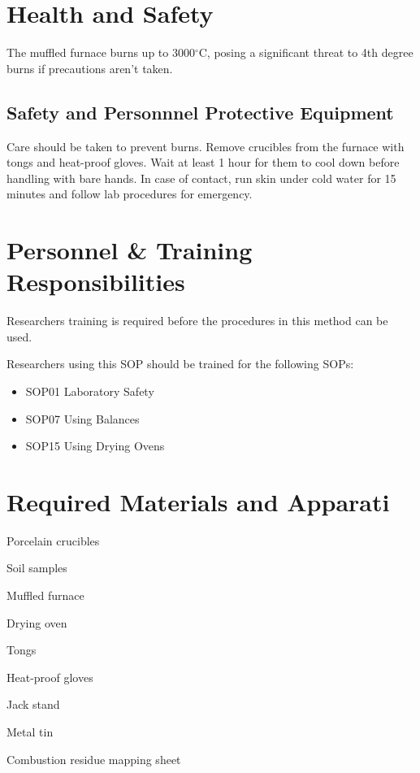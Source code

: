 \documentclass[12pt]{../SOP4_alpha}\usepackage[]{graphicx}\usepackage[]{xcolor}
\begin{document}
\section{Health and Safety}

\NP The muffled furnace burns up to 3000$^\circ$C, posing a significant threat to 4th degree burns if precautions aren't taken.

\subsection*{Safety and Personnnel Protective Equipment}

\NP Care should be taken to prevent burns. Remove crucibles from the furnace with tongs and heat-proof gloves. Wait at least 1 hour for them to cool down before handling with bare hands. In case of contact, run skin under cold water for 15 minutes and follow lab procedures for emergency. 

\section{Personnel \& Training Responsibilities}

\NP Researchers training is required before the procedures in this method can be used.

\NP Researchers using this SOP should be trained for the following SOPs:

\begin{itemize}
  \item SOP01 Laboratory Safety
  \item SOP07 Using Balances
  \item SOP15 Using Drying Ovens
\end{itemize}

\newpage 

\section{Required Materials and Apparati}

\begin{enumerate*}
	\item Porcelain crucibles
	\item Soil samples
	\item Muffled furnace
	\item Drying oven
	\item Tongs
	\item Heat-proof gloves
	\item Jack stand
	\item Metal tin
	\item Combustion residue mapping sheet
\end{enumerate*}
\end{document}
